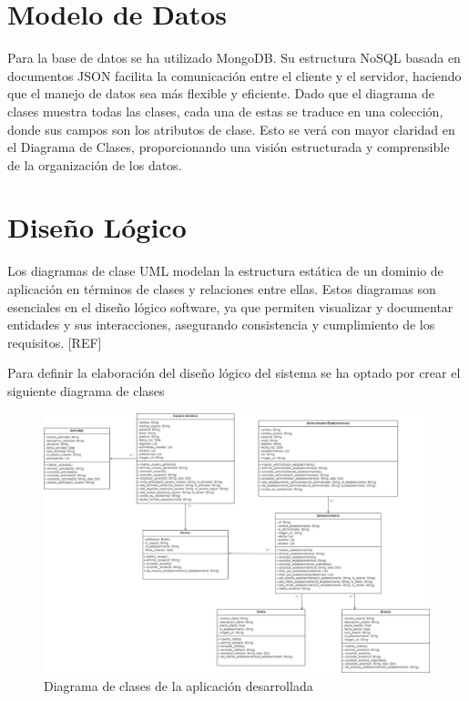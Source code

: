 \section{Modelo de Datos}

Para la base de datos se ha utilizado MongoDB. Su estructura NoSQL basada en documentos JSON facilita la comunicación entre el cliente y el servidor, haciendo que el manejo de datos sea más flexible y eficiente. Dado que el diagrama de clases muestra todas las clases, cada una de estas se traduce en una colección, donde sus campos son los atributos de clase. Esto se verá con mayor claridad en el Diagrama de Clases, proporcionando una visión estructurada y comprensible de la organización de los datos.

\section{Diseño Lógico}

Los diagramas de clase UML modelan la estructura estática de un dominio de aplicación en términos de clases y relaciones entre ellas. Estos diagramas son esenciales en el diseño lógico software, ya que permiten visualizar y documentar entidades y sus interacciones, asegurando consistencia y cumplimiento de los requisitos. [REF]

Para definir la elaboración del diseño lógico del sistema se ha optado por crear el siguiente diagrama de clases

\begin{figure}[H]
    \centering
    \includegraphics[width=\textwidth]{imagenes/DiagramaHangOut.jpg}
    \caption{Diagrama de clases de la aplicación desarrollada}
    \label{fig:DiagramaHangOut}
\end{figure}


